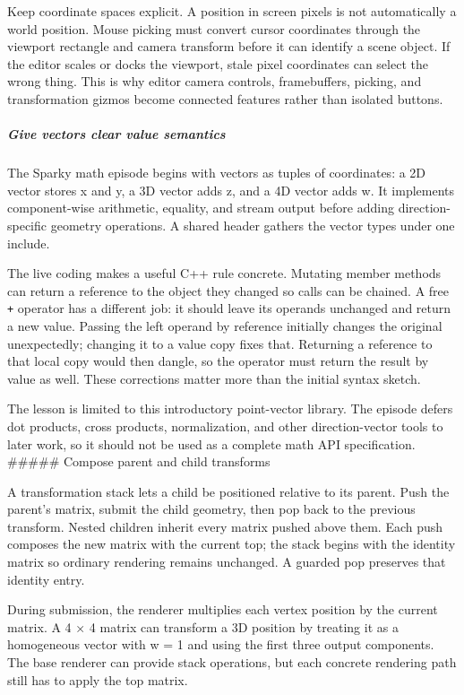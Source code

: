 Keep coordinate spaces explicit. A position in screen pixels is not automatically a world position. Mouse picking must convert cursor coordinates through the viewport rectangle and camera transform before it can identify a scene object. If the editor scales or docks the viewport, stale pixel coordinates can select the wrong thing. This is why editor camera controls, framebuffers, picking, and transformation gizmos become connected features rather than isolated buttons.

\subparagraph{Give vectors clear value semantics}\label{give-vectors-clear-value-semantics}

The Sparky math episode begins with vectors as tuples of coordinates: a 2D vector stores x and y, a 3D vector adds z, and a 4D vector adds w. It implements component-wise arithmetic, equality, and stream output before adding direction-specific geometry operations. A shared header gathers the vector types under one include.

The live coding makes a useful C++ rule concrete. Mutating member methods can return a reference to the object they changed so calls can be chained. A free \texttt{+} operator has a different job: it should leave its operands unchanged and return a new value. Passing the left operand by reference initially changes the original unexpectedly; changing it to a value copy fixes that. Returning a reference to that local copy would then dangle, so the operator must return the result by value as well. These corrections matter more than the initial syntax sketch.

The lesson is limited to this introductory point-vector library. The episode defers dot products, cross products, normalization, and other direction-vector tools to later work, so it should not be used as a complete math API specification. \#\#\#\#\# Compose parent and child transforms

A transformation stack lets a child be positioned relative to its parent. Push the parent's matrix, submit the child geometry, then pop back to the previous transform. Nested children inherit every matrix pushed above them. Each push composes the new matrix with the current top; the stack begins with the identity matrix so ordinary rendering remains unchanged. A guarded pop preserves that identity entry.

During submission, the renderer multiplies each vertex position by the current matrix. A 4 × 4 matrix can transform a 3D position by treating it as a homogeneous vector with w = 1 and using the first three output components. The base renderer can provide stack operations, but each concrete rendering path still has to apply the top matrix.

